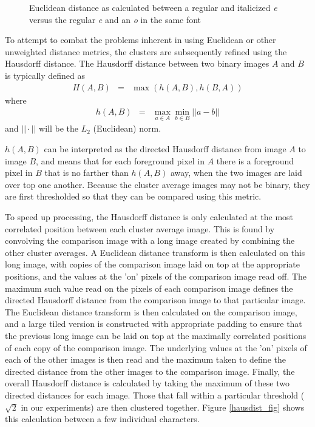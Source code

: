 \documentclass[times, 10pt,twocolumn]{article}
\begin{document}
\begin{figure}[ht]
  \centering
  \caption{Euclidean distance as calculated between a regular and italicized
  {\em e} versus the regular {\em e} and an {\em o} in the same font}
  \label{eucdist_fig}
\end{figure}

To attempt to combat the problems inherent in using Euclidean or other
unweighted distance metrics, the clusters are subsequently refined using the
Hausdorff distance\cite{rucklidge1996}.  The Hausdorff distance between two 
binary images $A$ and $B$ is typically defined as
\begin{eqnarray}
H(A,B) & = & \max(h(A,B), h(B,A))
\end{eqnarray}
where
\begin{eqnarray}
h(A,B) & = & \max_{a \in A} \min_{b \in B} || a - b ||
\end{eqnarray}
and $|| \cdot ||$ will be the $L_2$ (Euclidean) norm.

$h(A,B)$ can be interpreted as the directed Hausdorff distance from image $A$ to
image $B$, and means that for each foreground pixel in $A$ there is a foreground
pixel in $B$ that is no farther than $h(A,B)$ away, when the two images are 
laid over top one another.  Because the cluster average images may not be
binary, they are first thresholded so that they can be compared using this
metric.

To speed up processing, the Hausdorff distance is only calculated at the most
correlated position between each cluster average image.  This is found by
convolving the comparison image with a long image created by combining the
other cluster averages.  A Euclidean distance transform is then calculated on
this long image, with copies of the comparison image laid on top at the
appropriate positions, and the values at the 'on' pixels of the comparison 
image read off.  The maximum such value read on the pixels of each
comparison image defines the directed Hausdorff distance from the comparison 
image to that particular image.  The Euclidean distance transform is then
calculated on the comparison image, and a large tiled version is constructed
with appropriate padding to ensure that the previous long image can be laid on
top at the maximally correlated positions of each copy of the comparison image.
The underlying values at the 'on' pixels of each of the other images is then
read and the maximum taken to define the directed distance from the other
images to the comparison image.  Finally, the overall Hausdorff distance is
calculated by taking the maximum of these two directed distances for each
image.  Those that fall within a particular threshold ($\sqrt 2$ in our
experiments) are then clustered together.  Figure \ref{hausdist_fig}
shows this calculation between a few individual characters.
\end{document}
